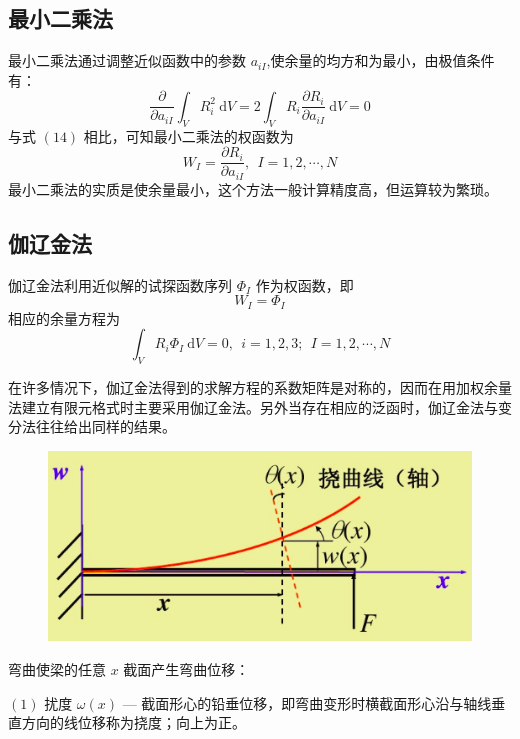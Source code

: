 \documentclass[12pt,a4paper]{article}
\begin{document}
\subsection{最小二乘法}
最小二乘法通过调整近似函数中的参数 $a_{iI}$,使余量的均方和为最小，由极值条件有：
\begin{equation}
\frac{\partial}{\partial a_{iI}}\int_{V} R^2_i ~ \mathrm{d}V=2\int_{V} R_i\frac{\partial R_i}{\partial a_{iI}} ~ \mathrm{d}V=0
\end{equation}
与式 $(14)$ 相比，可知最小二乘法的权函数为
\begin{equation}
W_I=\frac{\partial R_i}{\partial a_{iI}},~~I=1,2,\cdots ,N
\end{equation}
最小二乘法的实质是使余量最小，这个方法一般计算精度高，但运算较为繁琐。

\subsection{伽辽金法}
伽辽金法利用近似解的试探函数序列 $\Phi _I$ 作为权函数，即
\begin{equation}
W_I=\Phi _I
\end{equation}
相应的余量方程为
\begin{equation}
\int_{V} R_i\Phi _I ~ \mathrm{d}V=0,~~i=1,2,3;~~I=1,2,\cdots ,N
\end{equation}

在许多情况下，伽辽金法得到的求解方程的系数矩阵是对称的，因而在用加权余量法建立有限元格式时主要采用伽辽金法。另外当存在相应的泛函时，伽辽金法与变分法往往给出同样的结果。

\begin{figure}[H]
\centering
\includegraphics[scale=0.5]{./figures/2.png}
\caption{}
\end{figure}

弯曲使梁的任意 $x$ 截面产生弯曲位移：

$(1)$ 扰度 $\omega(x)$ — 截面形心的铅垂位移，即弯曲变形时横截面形心沿与轴线垂直方向的线位移称为挠度；向上为正。
\end{document}
